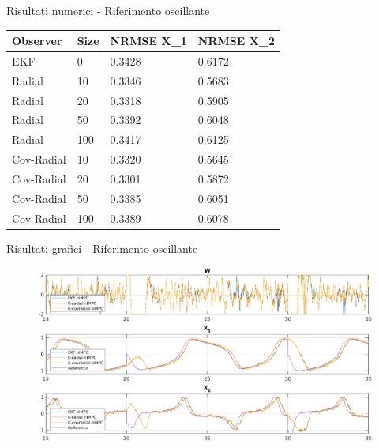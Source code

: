 \documentclass{beamer}
\begin{document}
\begin{frame}{Risultati numerici - Riferimento oscillante}
    \begin{table}[]
        \begin{tabular}{|llll|}
        \hline
        \textbf{Observer} & \textbf{Size} & \textbf{NRMSE X\_1} & \textbf{NRMSE X\_2} \\    \hline
        EKF         &   0   &   0.3428  &   0.6172  \\  \hline
        Radial      &   10  &   0.3346  &   0.5683  \\
        Radial      &   20  &   0.3318  &   0.5905  \\
        Radial      &   50  &   0.3392  &   0.6048  \\
        Radial      &   100 &   0.3417  &   0.6125  \\  \hline
        Cov-Radial  &   10  &   0.3320  &   0.5645  \\
        Cov-Radial  &   20  &   0.3301  &   0.5872  \\
        Cov-Radial  &   50  &   0.3385  &   0.6051  \\
        Cov-Radial  &   100 &   0.3389  &   0.6078  \\ \hline
        \end{tabular}
        \end{table}
\end{frame}

\begin{frame}{Risultati grafici - Riferimento oscillante}
    \begin{figure}
        \centering
        \includegraphics[width=\textwidth]{Figures/osc_reference.eps}
    \end{figure}
\end{frame}
\end{document}
